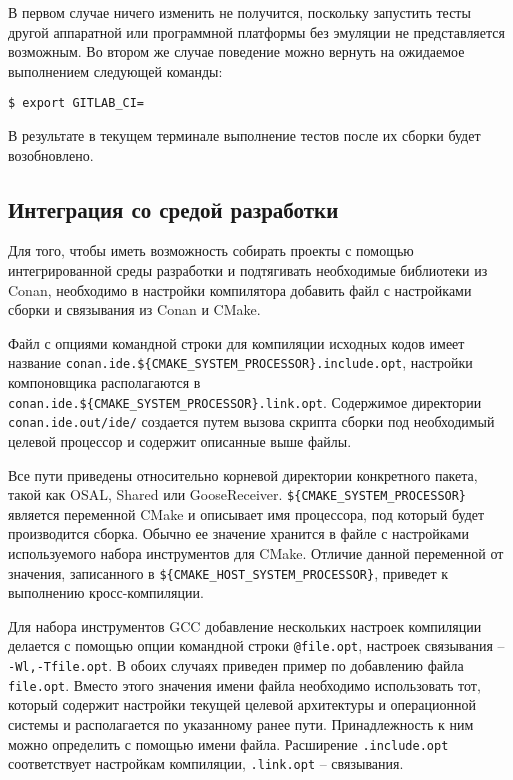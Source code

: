 В первом случае ничего изменить не получится, поскольку запустить
тесты другой аппаратной или программной платформы без эмуляции не представляется
возможным.
Во втором же случае поведение можно вернуть на ожидаемое выполнением следующей
команды:

\begin{lstlisting}
$ export GITLAB_CI=
\end{lstlisting}

В результате в текущем терминале выполнение тестов после их сборки
будет возобновлено.

\subsection{Интеграция со средой разработки}

Для того, чтобы иметь возможность собирать проекты с помощью
интегрированной среды разработки и подтягивать необходимые
библиотеки из Conan, необходимо в настройки компилятора добавить
файл с настройками сборки и связывания из Conan и CMake.

Файл с опциями командной строки для компиляции исходных кодов имеет название
\lstinline!conan.ide.${CMAKE_SYSTEM_PROCESSOR}.include.opt!,
настройки компоновщика располагаются в
\lstinline!conan.ide.${CMAKE_SYSTEM_PROCESSOR}.link.opt!.
Содержимое директории \lstinline!conan.ide.out/ide/! создается путем вызова скрипта
сборки под необходимый целевой процессор и содержит описанные выше файлы.

Все пути приведены относительно корневой директории конкретного пакета, такой как
OSAL, Shared или GooseReceiver.
\lstinline!${CMAKE_SYSTEM_PROCESSOR}! является переменной CMake и
описывает имя процессора, под который будет производится сборка.
Обычно ее значение хранится в файле с настройками используемого набора инструментов
для CMake. Отличие данной переменной от значения, записанного в
\lstinline!${CMAKE_HOST_SYSTEM_PROCESSOR}!, приведет к выполнению
кросс-компиляции.

Для набора инструментов GCC добавление нескольких настроек компиляции делается с помощью
опции командной строки
\lstinline`@file.opt`, настроек связывания -- \lstinline`-Wl,-Tfile.opt`.
В обоих случаях приведен пример по добавлению файла \lstinline`file.opt`.
Вместо этого значения имени файла необходимо использовать тот,
который содержит настройки текущей целевой архитектуры и операционной
системы и располагается по указанному ранее пути.
Принадлежность к ним можно определить с помощью имени файла.
Расширение \lstinline{.include.opt} соответствует настройкам компиляции,
\lstinline{.link.opt} -- связывания.

